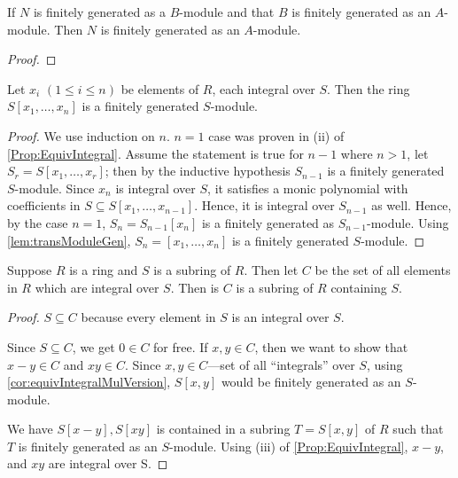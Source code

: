 \begin{lemma} \label{lem:transModuleGen}
  If \( N \) is finitely generated as a  \( B \)-module and that  \( B \) is finitely generated as an  \( A \)-module. Then  \( N \) is finitely generated as an  \( A \)-module.
\end{lemma}
\begin{proof}
\end{proof}
\begin{corollary}\label{cor:equivIntegralMulVersion}
  Let \( x_i \) \((1 \le i \le n) \) be elements of  \( R \), each integral over  \( S \). Then the ring  \( S[x_1, \ldots, x_n] \) is a finitely generated \( S \)-module.
\end{corollary}
\begin{proof}
  We use induction on \( n \).  \( n = 1 \) case was proven in (ii) of \autoref{Prop:EquivIntegral}. Assume the statement is true for \( n-1 \) where \( n > 1 \), let  \( S_r = S[x_1, \ldots, x_r] \); then by the inductive hypothesis \( S_{n-1} \) is a finitely generated  \( S \)-module. Since \( x_n \) is integral over  \( S \), it satisfies a monic polynomial with coefficients in  \( S \subseteq S[x_1, \ldots, x_{n-1}] \). Hence, it is integral over \( S_{n-1} \) as well. Hence, by the case \( n=1 \),  \( S_n = S_{n-1}[x_n] \) is a finitely generated as  \( S_{n-1} \)-module. Using \autoref{lem:transModuleGen}, \( S_n = [x_1, \ldots, x_n] \) is a finitely generated \( S \)-module.
\end{proof}
\begin{corollary}\label{cor:IntClSubring}
  Suppose \( R \) is a  ring and \( S \) is a subring of  \( R \). Then let  \( C \) be the set of all elements in  \( R \) which are integral over  \( S \). Then is  \( C \) is a subring of  \( R \) containing  \( S \).
\end{corollary}
\begin{proof}
  \( S \subseteq C \) because every element in \( S \) is an integral over  \( S \).

  Since \( S \subseteq C \), we get \( 0 \in C \) for free. If  \( x, y \in C \), then we want to show that  \( x - y \in C \) and  \( xy \in C\). Since \( x, y \in C \)---set of all ``integrals'' over  \( S \), using \autoref{cor:equivIntegralMulVersion}, \( S[x, y] \) would be finitely generated as an  \( S \)-module.

  We have \( S[x-y], S[xy]\) is contained in a subring  \( T = S[x,y] \) of  \( R \) such that  \( T \) is finitely generated as an  \( S \)-module. Using (iii) of \autoref{Prop:EquivIntegral}, \( x-y \), and  \( xy \) are integral over S.  
\end{proof}
